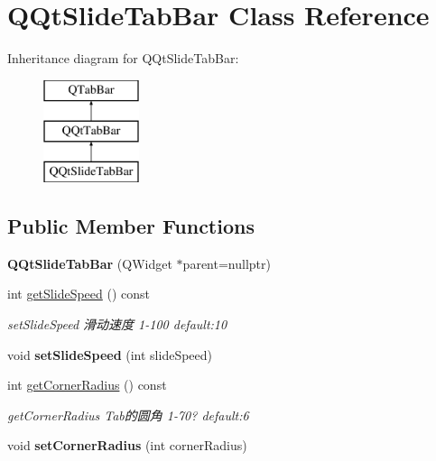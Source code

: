 \hypertarget{class_q_qt_slide_tab_bar}{}\section{Q\+Qt\+Slide\+Tab\+Bar Class Reference}
\label{class_q_qt_slide_tab_bar}
Inheritance diagram for Q\+Qt\+Slide\+Tab\+Bar\+:\begin{figure}[H]
\begin{center}
\leavevmode
\includegraphics[height=3.000000cm]{class_q_qt_slide_tab_bar}
\end{center}
\end{figure}
\subsection*{Public Member Functions}
\begin{DoxyCompactItemize}
\item 
\mbox{\label{class_q_qt_slide_tab_bar_ad0c26f0eba9524fcd19bd7fdc918beb6}} 
{\bfseries Q\+Qt\+Slide\+Tab\+Bar} (Q\+Widget $\ast$parent=nullptr)
\item 
int \mbox{\hyperlink{class_q_qt_slide_tab_bar_a8eb9d5bd680aabb2f760b4cd2f8c422d}{get\+Slide\+Speed}} () const
\begin{DoxyCompactList}\small\item\em set\+Slide\+Speed 滑动速度 1-\/100 default\+:10 \end{DoxyCompactList}\item 
\mbox{\label{class_q_qt_slide_tab_bar_a48a111b96836480a66ccf356fdf81153}} 
void {\bfseries set\+Slide\+Speed} (int slide\+Speed)
\item 
int \mbox{\hyperlink{class_q_qt_slide_tab_bar_ad78c261ab8f1fafdf3a1af5d29677b2a}{get\+Corner\+Radius}} () const
\begin{DoxyCompactList}\small\item\em get\+Corner\+Radius Tab的圆角 1-\/70? default\+:6 \end{DoxyCompactList}\item 
\mbox{\label{class_q_qt_slide_tab_bar_a400a428503fa4935acc70ca031e7ce87}} 
void {\bfseries set\+Corner\+Radius} (int corner\+Radius)
\end{DoxyCompactItemize}
